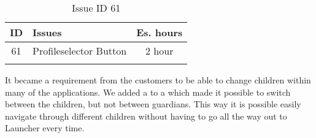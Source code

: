 \begin{longtable} { | c | p{12cm} | c | } 
\hline
	ID 	&	Issues	&		 Es. hours \\\hline
	61	&	Profileselector Button	&	2 hour	\\\hline
\caption{Issue ID 61}
\label{tab:spr4_profselector}
\end{longtable}

It became a requirement from the customers to be able to change children within many of the applications. We added a  to a  which made it possible to switch between the children, but not between guardians. This way it is possible easily navigate through different children without having to go all the way out to Launcher every time.